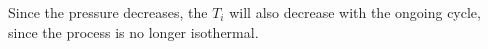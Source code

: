 Since the pressure decreases, the \( T_i \) will also decrease with the ongoing cycle, since the process is no longer isothermal.
